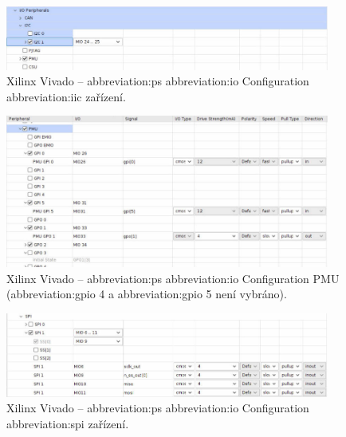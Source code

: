 \documentclass[a4paper, twoside, 11pt]{article}
\begin{document}
				\begin{figure}[htbp!]
					\centering
					\includegraphics[width=0.95\textwidth]{src/png/kr26-xilinx-vivado-flow/kr26-xilix-vivado-flow-18.jpg}
					\caption{Xilinx Vivado – \gls{abbreviation:ps} \gls{abbreviation:io} Configuration \gls{abbreviation:iic} zařízení.}
					\label{fig:kr26-xilix-vivado-flow-18}
				\end{figure}


				\begin{figure}[htbp!]
					\centering
					\includegraphics[width=0.95\textwidth]{src/png/kr26-xilinx-vivado-flow/kr26-xilix-vivado-flow-19.jpg}
					\caption{Xilinx Vivado – \gls{abbreviation:ps} \gls{abbreviation:io} Configuration PMU (\gls{abbreviation:gpio} 4 a \gls{abbreviation:gpio} 5 není vybráno).}
					\label{fig:kr26-xilix-vivado-flow-19}
				\end{figure}

				\begin{figure}[htbp!]
					\centering
					\includegraphics[width=0.95\textwidth]{src/png/kr26-xilinx-vivado-flow/kr26-xilix-vivado-flow-20.jpg}
					\caption{Xilinx Vivado – \gls{abbreviation:ps} \gls{abbreviation:io} Configuration \gls{abbreviation:spi} zařízení.}
					\label{fig:kr26-xilix-vivado-flow-20}
				\end{figure}
\end{document}
